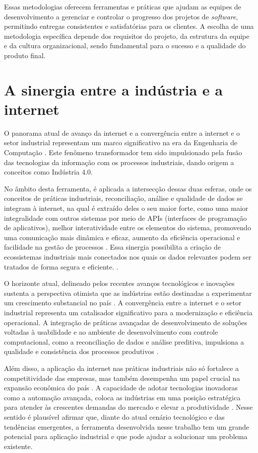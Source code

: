 Essas metodologias oferecem ferramentas e práticas que ajudam as equipes de desenvolvimento a gerenciar e controlar o progresso dos projetos de \textit{software}, permitindo entregas consistentes e satisfatórias para os clientes. A escolha de uma metodologia específica depende dos requisitos do projeto, da estrutura da equipe e da cultura organizacional, sendo fundamental para o sucesso e a qualidade do produto final.

\section{A sinergia entre a indústria e a internet}

O panorama atual de avanço da internet e a convergência entre a internet e o setor industrial representam um marco significativo na era da Engenharia de Computação \cite{industry4status}. Este fenômeno transformador tem sido impulsionado pela fusão das tecnologias da informação com os processos industriais, dando origem a conceitos como Indústria 4.0.

No âmbito desta ferramenta, é aplicada a intersecção dessas duas esferas, onde os conceitos de práticas industriais, reconciliação, análise e qualidade de dados se integram à internet, na qual é extraído deles o seu maior forte, como uma maior integralidade com outros sistemas por meio de APIs (interfaces de programação de aplicativos), melhor interatividade entre os elementos do sistema, promovendo uma comunicação mais dinâmica e eficaz, aumento da eficiência operacional e facilidade na gestão de processos \cite{industry4}. Essa sinergia possibilita a criação de ecossistemas industriais mais conectados nos quais os dados relevantes podem ser tratados de forma segura e eficiente. \cite{industrybuild}.

O horizonte atual, delineado pelos recentes avanços tecnológicos e inovações sustenta a perspectiva otimista que as indústrias estão destinadas a experimentar um crescimento substancial no país \cite{industrychina}. A convergência entre a internet e o setor industrial representa um catalisador significativo para a modernização e eficiência operacional. A integração de práticas avançadas de desenvolvimento de soluções voltadas à usabilidade e ao ambiente de desenvolvimento com controle computacional, como a reconciliação de dados e análise preditiva, impulsiona a qualidade e consistência dos processos produtivos \cite{industrydigital}.

Além disso, a aplicação da internet nas práticas industriais não só fortalece a competitividade das empresas, mas também desempenha um papel crucial na expansão econômica do país \cite{industryiot}. A capacidade de adotar tecnologias inovadoras como a automação avançada, coloca as indústrias em uma posição estratégica para atender às crescentes demandas do mercado e elevar a produtividade \cite{industryinternet}. Nesse sentido é plausível afirmar que, diante do atual cenário tecnológico e das tendências emergentes, a ferramenta desenvolvida nesse trabalho tem um grande potencial para aplicação industrial e que pode ajudar a solucionar um problema existente.